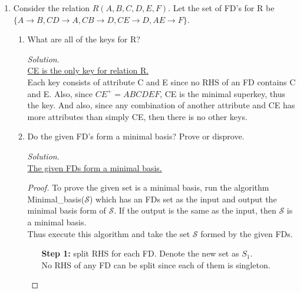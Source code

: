 \documentclass[10pt]{article}
\begin{document}
\begin{enumerate}
    \item Consider the relation $R(A, B, C, D, E, F)$.
    Let the set of FD’s for R be $\{A \rightarrow B,CD \rightarrow A,CB \rightarrow D,CE \rightarrow D,AE \rightarrow F\}$.
    \begin{enumerate}
        \item What are all of the keys for R?
        
        \begin{mdframed}[leftmargin=-6.5mm]
        
        \textit{Solution}.\\
        \underline{CE is the only key for relation R.}\\
        \newline
        Each key consists of attribute C and E since no RHS of an FD contains C and E. Also, since 
        $CE^+ = ABCDEF$, CE is the minimal superkey, thus the key. And also, since any combination 
        of another attribute and CE has more attributes than simply CE, then there is no other keys.
        \end{mdframed}
        
        \item Do the given FD’s form a minimal basis? Prove or disprove.
        
        \begin{mdframed}[leftmargin=-6.5mm]
        \textit{Solution}.\\
        \underline{The given FDs form a minimal basis.}
        
        \begin{proof}
        To prove the given set is a minimal basis, run the algorithm Minimal\_basis($\mathcal{S}$) which has an FDs set as the input and output the minimal basis form of $\mathcal{S}$. If the output is the same as the input, then $\mathcal{S}$ is a minimal basis.\\
        Thus execute this algorithm and take the set $\mathcal{S}$ formed by the given FDs.
        \begin{enumerate}[leftmargin=16mm]
            \item[\textbf{Step 1: }]split RHS for each FD. Denote the new set as $S_1$.\\
            No RHS of any FD can be split since each of them is singleton.
            

\end{enumerate}
\end{proof}
\end{mdframed}
\end{enumerate}
\end{enumerate}
\end{document}
